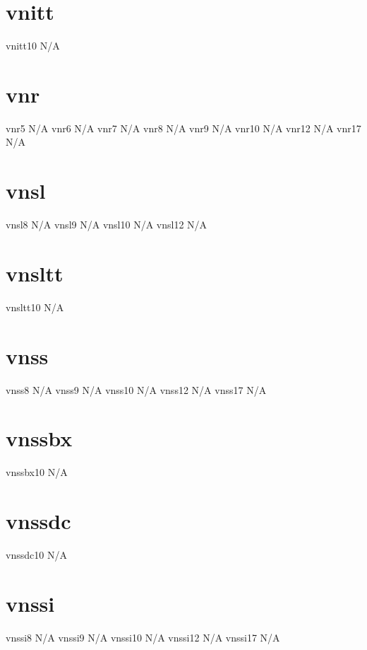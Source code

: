 \documentclass[sample]{vnsample}
\begin{document}
\section{vnitt}
  {vnitt10}  {N/A}

\section{vnr}
    {vnr5}     {N/A}
    {vnr6}     {N/A}
    {vnr7}     {N/A}
    {vnr8}     {N/A}
    {vnr9}     {N/A}
    {vnr10}    {N/A}
    {vnr12}    {N/A}
    {vnr17}    {N/A}

\section{vnsl}
   {vnsl8}    {N/A}
   {vnsl9}    {N/A}
   {vnsl10}   {N/A}
   {vnsl12}   {N/A}

\section{vnsltt}
  {vnsltt10} {N/A}

\section{vnss}
   {vnss8}    {N/A}
   {vnss9}    {N/A}
   {vnss10}   {N/A}
   {vnss12}   {N/A}
   {vnss17}   {N/A}

\section{vnssbx}
  {vnssbx10} {N/A}

\section{vnssdc}
  {vnssdc10} {N/A}

\section{vnssi}
  {vnssi8}   {N/A}
  {vnssi9}   {N/A}
  {vnssi10}  {N/A}
  {vnssi12}  {N/A}
  {vnssi17}  {N/A}
\end{document}
